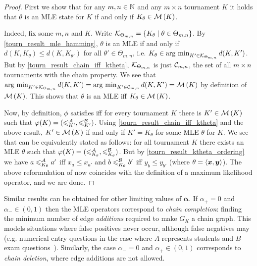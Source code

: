 \begin{proof}
    First we show that for any $m, n \in \mathbb{N}$ and any $m \times n$ tournament
    $K$ it holds that $\theta$ is an MLE state for $K$ if and only if $K_\theta
    \in \operatorname{\mathcal{M}}\left({K}\right)$.

    Indeed, fix some $m, n$ and $K$. Write $\mathcal{K}_{\Theta_{m,n}} = \{K_\theta \mid
    \theta \in \Theta_{m,n}\}$. By \cref{tourn_result_mle_hamming}, $\theta$ is an MLE
    if and only if $d(K, K_\theta) \le d(K, K_{\theta'})$ for all $\theta' \in
    \Theta_{m,n}$, i.e. $K_\theta \in \operatorname*{arg\ min}_{K' \in \mathcal{K}_{\Theta_{m,n}}}{d(K,
    K')}$. But by \cref{tourn_result_chain_iff_ktheta}, $\mathcal{K}_{\Theta_{m,n}}$ is just
    $\mathcal{C}_{m,n}$, the set of all $m \times n$ tournaments with the chain
    property. We see that $\operatorname*{arg\ min}_{K' \in \mathcal{K}_{\Theta_{m,n}}}{d(K, K')} =
    \operatorname*{arg\ min}_{K' \in \mathcal{C}_{m,n}}{d(K, K')} = \operatorname{\mathcal{M}}\left({K}\right)$ by definition of
    $\operatorname{\mathcal{M}}\left({K}\right)$. This shows that $\theta$ is an MLE iff $K_\theta \in
    \operatorname{\mathcal{M}}\left({K}\right)$.

    Now, by definition, $\phi$ satisfies  iff for every
    tournament $K$ there is $K' \in \operatorname{\mathcal{M}}\left({K}\right)$ such that $\varphi(K) =
    ({\leqslant^{\mathcal{A}}_{K'}}, {\leqslant^{\mathcal{B}}_{K'}})$. Using \cref{tourn_result_chain_iff_ktheta} and the
    above result, $K' \in \operatorname{\mathcal{M}}\left({K}\right)$ if and only if $K' = K_\theta$ for some
    MLE $\theta$ for $K$. We see that  can be equivalently
    stated as follows: for all tournament $K$ there exists an MLE $\theta$ such
    that $\varphi(K) = ({\leqslant^{\mathcal{A}}_{K_\theta}}, {\leqslant^{\mathcal{B}}_{K_\theta}})$. But by
    \cref{tourn_result_ktheta_ordering} we have $a \leqslant^{\mathcal{A}}_{K_\theta} a'$ iff $x_a \le
    x_{a'}$ and $b \leqslant^{\mathcal{B}}_{K_\theta} b'$ iff $y_b \le y_{b'}$ (where $\theta =
    \langle{\bm{x}, \bm{y}}\rangle$). The above reformulation of 
    now coincides with the definition of a maximum likelihood operator, and we
    are done.
\end{proof}

Similar results can be obtained for
other limiting values of $\bm{\alpha}$. If $\alpha_+ = 0$ and $\alpha_- \in (0,
1)$ then the MLE operators correspond to \emph{chain completion}: finding
the minimum number of edge \emph{additions} required to make $G_K$ a chain graph. This
models situations where false positives never occur, although false negatives
may (e.g. numerical entry questions in the case where $A$ represents students
and $B$ exam questions~\cite{jiao2017algorithms}). Similarly, the case
$\alpha_- = 0$ and $\alpha_+ \in (0, 1)$ corresponds to \emph{chain deletion},
where edge additions are not allowed.

